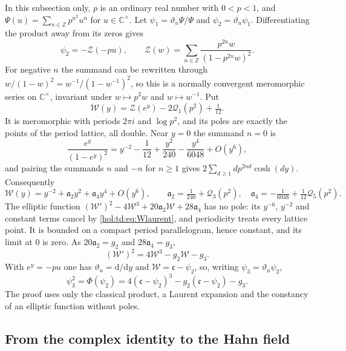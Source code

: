 \documentclass[11pt]{article}
\numberwithin{equation}{section}
\theoremstyle{definition}
\theoremstyle{remark}
\newcommand{\C}{\mathbb C}
\newcommand{\Z}{\mathbb Z}
\begin{document}
In this subsection only, $p$ is an ordinary real number with $0<p<1$, and
$\Psi(u)=\sum_{n\in\Z}p^{n^2}u^n$ for $u\in\C^\times$. Let
$\psi_1=\vartheta_u\Psi/\Psi$ and $\psi_2=\vartheta_u\psi_1$. Differentiating
the product away from its zeros gives
\begin{equation}\label{hol:td:eq:S}
 \psi_2=-\mathcal Z(-pu),\qquad
 \mathcal Z(w)=\sum_{n\in\Z}\frac{p^{2n}w}{(1-p^{2n}w)^2}.
\end{equation}
For negative $n$ the summand can be rewritten through
$w/(1-w)^2=w^{-1}/(1-w^{-1})^2$, so this is a normally convergent meromorphic
series on $\C^\times$, invariant under $w\mapsto p^2w$ and $w\mapsto w^{-1}$.
Put
\[
 \mathcal W(y)=\mathcal Z(e^y)-2\mathcal Q_1(p^2)+\tfrac1{12}.
\]
It is meromorphic with periods $2\pi i$ and $\log p^2$, and its poles are
exactly the points of the period lattice, all double. Near $y=0$ the summand
$n=0$ is
\[
 \frac{e^y}{(1-e^y)^2}=y^{-2}-\frac1{12}+\frac{y^2}{240}-\frac{y^4}{6048}+O(y^6),
\]
and pairing the summands $n$ and $-n$ for $n\ge1$ gives
$2\sum_{d\ge1}dp^{2nd}\cosh(dy)$. Consequently
\begin{equation}\label{hol:td:eq:Wlaurent}
 \mathcal W(y)=y^{-2}+\mathfrak a_2y^2+\mathfrak a_4y^4+O(y^6),\qquad
 \mathfrak a_2=\tfrac1{240}+\mathcal Q_3(p^2),\quad
 \mathfrak a_4=-\tfrac1{6048}+\tfrac1{12}\mathcal Q_5(p^2).
\end{equation}
The elliptic function $(\mathcal W')^2-4\mathcal W^3+20\mathfrak a_2\mathcal
W+28\mathfrak a_4$ has no pole: its $y^{-6}$, $y^{-2}$ and constant terms
cancel by \eqref{hol:td:eq:Wlaurent}, and periodicity treats every lattice
point. It is bounded on a compact period parallelogram, hence constant, and
its limit at $0$ is zero. As $20\mathfrak a_2=g_2$ and $28\mathfrak a_4=g_3$,
\[
 (\mathcal W')^2=4\mathcal W^3-g_2\mathcal W-g_3 .
\]
With $e^y=-pu$ one has $\vartheta_u=\mathrm d/\mathrm d y$ and $\mathcal W=\mathfrak
c-\psi_2$, so, writing $\psi_3=\vartheta_u\psi_2$,
\begin{equation}\label{hol:td:eq:ellipticdelta}
 \psi_3^2=\Phi(\psi_2)=4(\mathfrak c-\psi_2)^3-g_2(\mathfrak c-\psi_2)-g_3 .
\end{equation}
The proof uses only the classical product, a Laurent expansion and the
constancy of an elliptic function without poles.

\subsection{From the complex identity to the Hahn field}
\label{hol:td:sub:formal}
\end{document}
